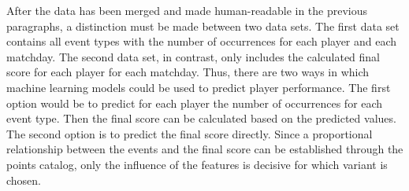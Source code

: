 After the data has been merged and made human-readable in the previous paragraphs, a distinction must be made between two data sets. The first data set contains all event types with the number of occurrences for each player and each matchday. The second data set, in contrast, only includes the calculated final score for each player for each matchday. Thus, there are two ways in which machine learning models could be used to predict player performance. The first option would be to predict for each player the number of occurrences for each event type. Then the final score can be calculated based on the predicted values. The second option is to predict the final score directly. Since a proportional relationship between the events and the final score can be established through the points catalog, only the influence of the features is decisive for which variant is chosen. 



